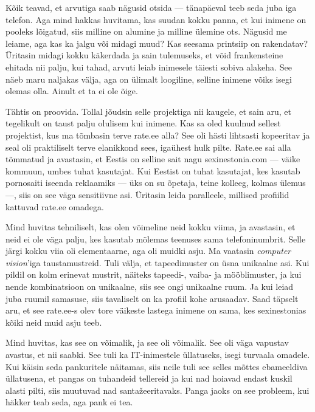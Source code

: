 Kõik teavad, et arvutiga saab nägusid otsida --- tänapäeval teeb seda juba iga 
telefon. Aga mind hakkas huvitama, kas suudan kokku panna, et kui 
inimene on pooleks lõigatud, siis milline on alumine ja milline ülemine ots. 
Nägusid me leiame, aga kas ka jalgu või midagi 
muud? Kas seesama printsiip on rakendatav? Üritasin midagi kokku käkerdada ja 
sain tulemuseks, et võid frankensteine ehitada nii palju, kui tahad, 
arvuti leiab inimesele täiesti sobiva alakeha. See näeb maru naljakas välja, 
aga on ülimalt loogiline, selline inimene võiks isegi 
olemas olla. Ainult et ta ei ole õige. 

Tähtis on proovida. Tollal jõudsin selle projektiga 
nii kaugele, et sain aru, et tegelikult on taust palju olulisem kui inimene. 
Kas sa oled kuulnud sellest projektist, kus ma tõmbasin terve 
rate.ee alla? See oli hästi lihtsasti 
kopeeritav ja seal oli praktiliselt terve elanikkond sees, igaühest 
hulk pilte. Rate.ee sai alla tõmmatud ja avastasin, et Eestis on
selline sait nagu sexinestonia.com --- väike kommuun, umbes tuhat kasutajat. Kui 
Eestist on tuhat kasutajat, kes kasutab pornosaiti iseenda reklaamiks --- üks on su õpetaja, teine kolleeg, kolmas ülemus ---, 
siis on see väga sensitiivne asi. Üritasin leida paralleele, millised 
profiilid kattuvad rate.ee omadega. 

Mind huvitas tehniliselt, kas olen võimeline neid kokku viima, ja 
avastasin, et neid ei ole väga palju, kes kasutab mõlemas teenuses sama 
telefoninumbrit. Selle järgi kokku viia oli elementaarne, aga oli 
muidki asju. Ma vaatasin \emph{computer vision}'iga taustamustreid. Tuli välja, et tapeedimuster on üsna unikaalne asi. Kui 
pildil on kolm erinevat mustrit, näiteks tapeedi-, vaiba- ja mööblimuster, ja kui nende kombinatsioon on unikaalne, 
siis see ongi unikaalne ruum. Ja kui leiad juba ruumil samasuse, siis 
tavaliselt on ka profiil kohe arusaadav. Saad täpselt aru, et see 
rate.ee-s olev tore väikeste lastega inimene on sama, kes sexinestonias 
kõiki neid muid asju teeb. 


Mind huvitas, kas see on võimalik, ja see oli võimalik. See oli väga 
vapustav avastus, et nii saabki. See tuli ka IT-inimestele üllatuseks, 
isegi turvaala omadele. Kui käisin seda pankuritele 
näitamas, siis neile tuli see selles mõttes ebameeldiva üllatusena, et 
pangas on tuhandeid tellereid ja kui nad hoiavad endast kuskil alasti pilti, siis
muutuvad nad santažeeritavaks. Panga jaoks on see probleem, kui häkker 
teab seda, aga pank ei tea. 

